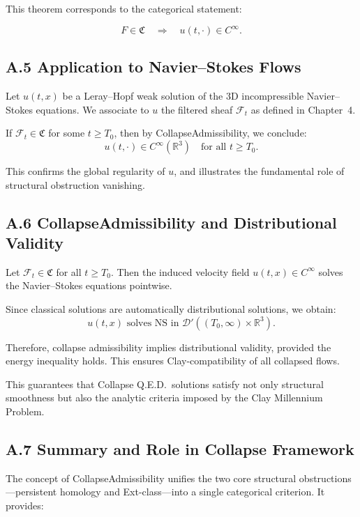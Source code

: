 \documentclass[11pt]{article}
\begin{document}
This theorem corresponds to the categorical statement:

\[
F \in \mathfrak{C} \quad \Rightarrow \quad u(t, \cdot) \in C^\infty.
\]

\subsection{A.5 Application to Navier--Stokes Flows}

Let \( u(t,x) \) be a Leray--Hopf weak solution of the 3D incompressible Navier--Stokes equations. We associate to \( u \) the filtered sheaf \( \mathcal{F}_t \) as defined in Chapter~4.

If \( \mathcal{F}_t \in \mathfrak{C} \) for some \( t \geq T_0 \), then by CollapseAdmissibility, we conclude:
\[
u(t, \cdot) \in C^\infty(\mathbb{R}^3) \quad \text{for all } t \geq T_0.
\]

This confirms the global regularity of \( u \), and illustrates the fundamental role of structural obstruction vanishing.

\subsection*{A.6 CollapseAdmissibility and Distributional Validity}

Let \( \mathcal{F}_t \in \mathfrak{C} \) for all \( t \geq T_0 \). Then the induced velocity field \( u(t,x) \in C^\infty \) solves the Navier--Stokes equations pointwise.

Since classical solutions are automatically distributional solutions, we obtain:
\[
u(t,x) \text{ solves NS in } \mathcal{D}'((T_0, \infty) \times \mathbb{R}^3).
\]

Therefore, collapse admissibility implies distributional validity, provided the energy inequality holds. This ensures Clay-compatibility of all collapsed flows.

This guarantees that Collapse Q.E.D.\ solutions satisfy not only structural smoothness but also the analytic criteria imposed by the Clay Millennium Problem.

\subsection*{A.7 Summary and Role in Collapse Framework}

The concept of CollapseAdmissibility unifies the two core structural obstructions—persistent homology and Ext-class—into a single categorical criterion. It provides:
\end{document}
